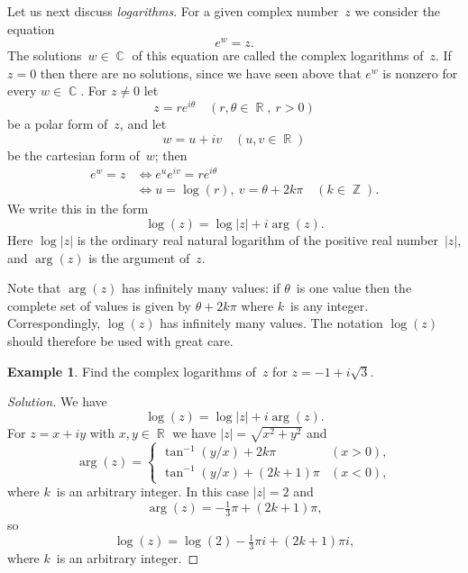 \documentclass{amsproc}
\theoremstyle{definition}
\newtheorem{example}[theorem]{Example}
\newenvironment{solution}{\begin{proof}[Solution]}{\end{proof}}
\theoremstyle{remark}
\DeclareMathOperator{\Z}{\mathbb{Z}}
\DeclareMathOperator{\R}{\mathbb{R}}
\DeclareMathOperator{\C}{\mathbb{C}}
\numberwithin{equation}{section}
\begin{document}
Let us next discuss \emph{logarithms}. For a given complex number~$ z $ we consider the equation
$$
e^w = z.
$$
The solutions~$ w \in \C $ of this equation are called the complex logarithms of~$ z $. If $ z = 0 $ then there are no solutions, since we have seen above that $ e^w $
is nonzero for every $ w \in \C $. For $ z \neq 0 $ let
$$
z = r e^{i\theta} \quad (r,\theta \in \R,\ r>0)
$$
be a polar form of~$ z $, and let
$$
w = u + iv\quad (u,v \in \R)
$$
be the cartesian form of~$ w $; then
\begin{align*}
e^w = z
&\iff e^u e^{iv} = re^{i\theta}\\
&\iff u = \log(r),\ v = \theta + 2k\pi\quad (k\in\Z).
\end{align*}
We write this in the form
$$
\log(z) = \log|z| + i\arg(z).
$$
Here
$ \log |z| $ is the ordinary real natural logarithm of the positive real number~$ |z| $,
and $ \arg(z) $ is the argument of~$ z $.

Note that $ \arg(z) $ has infinitely many values: if $ \theta $~is one value then the complete set of values
is given by $ \theta + 2k\pi $ where $ k $~is any integer. Correspondingly, $ \log(z) $ has infinitely many values. The notation $ \log(z) $ should therefore be used with great care.


\begin{example} \label{CME3.1}
Find the complex logarithms of~$ z $ for $ z = -1 + i\sqrt{3} $.
\end{example}

\begin{solution}
We have
$$
\log(z) = \log |z| + i\arg(z).
$$
For $ z = x + iy $ with $ x,y \in \R $ we have $ |z| = \sqrt{x^2 + y^2} $ and
$$
\arg(z) =
\begin{cases}
\tan^{-1}(y/x)+2k\pi&(x>0),\\
\tan^{-1}(y/x)+(2k+1)\pi&(x<0),
\end{cases}
$$
where $ k $~is an arbitrary integer. In this case $ |z| = 2 $ and
$$
\arg(z) = -\tfrac{1}{3}\pi + (2k+1)\pi,
$$
so
$$
\log(z) = \log(2) - \tfrac{1}{3}\pi i + (2k + 1)\pi i,
$$
where $ k $~is an arbitrary integer.
\end{solution}
\end{document}
